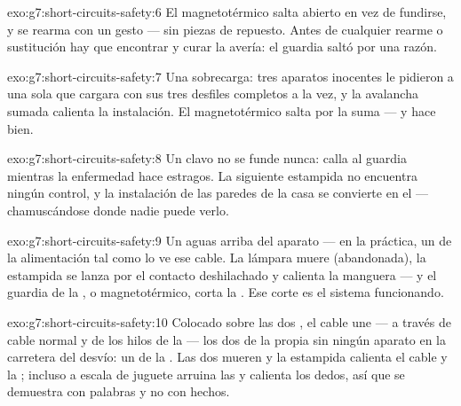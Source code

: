 \begin{solution}{exo:g7:short-circuits-safety:6}
El magnetotérmico salta abierto en vez de fundirse, y se rearma con
un gesto --- sin piezas de repuesto. Antes de cualquier rearme o
sustitución hay que encontrar y curar la avería: el guardia saltó por
una razón.
\end{solution}

\begin{solution}{exo:g7:short-circuits-safety:7}
Una sobrecarga: tres aparatos inocentes le pidieron a una sola
 que cargara con sus tres desfiles completos a la vez, y la
avalancha sumada calienta la instalación. El magnetotérmico salta por
la suma --- y hace bien.
\end{solution}

\begin{solution}{exo:g7:short-circuits-safety:8}
Un clavo no se funde nunca: calla al guardia mientras la enfermedad
hace estragos. La siguiente estampida no encuentra ningún control, y
la instalación de las paredes de la casa se convierte en el
 --- chamuscándose donde nadie puede verlo.
\end{solution}

\begin{solution}{exo:g7:short-circuits-safety:9}
Un  aguas arriba del aparato --- en la práctica, un
 de la alimentación tal como lo ve ese cable. La lámpara
muere (abandonada), la estampida se lanza por el contacto
deshilachado y calienta la manguera --- y el guardia de la
,  o magnetotérmico, corta la . Ese
corte es el sistema funcionando.
\end{solution}

\begin{solution}{exo:g7:short-circuits-safety:10}
Colocado sobre las dos , el cable une --- a través de cable
normal y de los hilos de la  --- los dos  de la
propia  sin ningún aparato en la carretera del desvío: un
 de la . Las dos  mueren y la
estampida calienta el cable y la ; incluso a escala de
juguete arruina las  y calienta los dedos, así que se demuestra
con palabras y no con hechos.
\end{solution}

